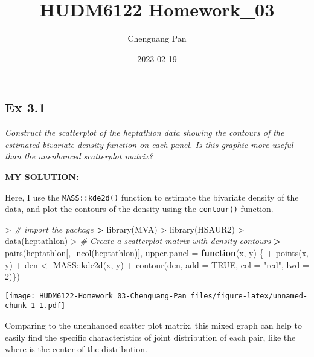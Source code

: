 \documentclass[
]{article}
\title{HUDM6122 Homework\_03}
\author{Chenguang Pan}
\date{2023-02-19}
\newenvironment{Shaded}{\begin{snugshade}}{\end{snugshade}}
\newcommand{\AttributeTok}[1]{\textcolor[rgb]{0.77,0.63,0.00}{#1}}
\newcommand{\CommentTok}[1]{\textcolor[rgb]{0.56,0.35,0.01}{\textit{#1}}}
\newcommand{\ConstantTok}[1]{\textcolor[rgb]{0.00,0.00,0.00}{#1}}
\newcommand{\ControlFlowTok}[1]{\textcolor[rgb]{0.13,0.29,0.53}{\textbf{#1}}}
\newcommand{\DecValTok}[1]{\textcolor[rgb]{0.00,0.00,0.81}{#1}}
\newcommand{\ErrorTok}[1]{\textcolor[rgb]{0.64,0.00,0.00}{\textbf{#1}}}
\newcommand{\FunctionTok}[1]{\textcolor[rgb]{0.00,0.00,0.00}{#1}}
\newcommand{\NormalTok}[1]{#1}
\newcommand{\OtherTok}[1]{\textcolor[rgb]{0.56,0.35,0.01}{#1}}
\newcommand{\SpecialCharTok}[1]{\textcolor[rgb]{0.00,0.00,0.00}{#1}}
\newcommand{\StringTok}[1]{\textcolor[rgb]{0.31,0.60,0.02}{#1}}
\begin{document}
\maketitle

\hypertarget{ex-3.1}{%
\subsection{Ex 3.1}\label{ex-3.1}}

\emph{Construct the scatterplot of the heptathlon data showing the
contours of the estimated bivariate density function on each panel. Is
this graphic more useful than the unenhanced scatterplot matrix?}

\textbf{MY SOLUTION:}

Here, I use the \texttt{MASS::kde2d()} function to estimate the
bivariate density of the data, and plot the contours of the density
using the \texttt{contour()} function.

\begin{Shaded}
\begin{Highlighting}[]
\SpecialCharTok{\textgreater{}} \CommentTok{\# import the package}
\ErrorTok{\textgreater{}} \FunctionTok{library}\NormalTok{(MVA)}
\SpecialCharTok{\textgreater{}} \FunctionTok{library}\NormalTok{(HSAUR2)}
\SpecialCharTok{\textgreater{}} \FunctionTok{data}\NormalTok{(heptathlon)}
\SpecialCharTok{\textgreater{}} \CommentTok{\# Create a scatterplot matrix with density contours}
\ErrorTok{\textgreater{}} \FunctionTok{pairs}\NormalTok{(heptathlon[, }\SpecialCharTok{{-}}\FunctionTok{ncol}\NormalTok{(heptathlon)], }\AttributeTok{upper.panel =} \ControlFlowTok{function}\NormalTok{(x, y) \{}
\SpecialCharTok{+}   \FunctionTok{points}\NormalTok{(x, y)}
\SpecialCharTok{+}\NormalTok{   den }\OtherTok{\textless{}{-}}\NormalTok{ MASS}\SpecialCharTok{::}\FunctionTok{kde2d}\NormalTok{(x, y)}
\SpecialCharTok{+}   \FunctionTok{contour}\NormalTok{(den, }\AttributeTok{add =} \ConstantTok{TRUE}\NormalTok{, }\AttributeTok{col =} \StringTok{"red"}\NormalTok{, }\AttributeTok{lwd =} \DecValTok{2}\NormalTok{)\})}
\end{Highlighting}
\end{Shaded}

\texttt{[image: HUDM6122-Homework\_03-Chenguang-Pan\_files/figure-latex/unnamed-chunk-1-1.pdf]}

Comparing to the unenhanced scatter plot matrix, this mixed graph can
help to easily find the specific characteristics of joint distribution
of each pair, like the where is the center of the distribution.
\end{document}
